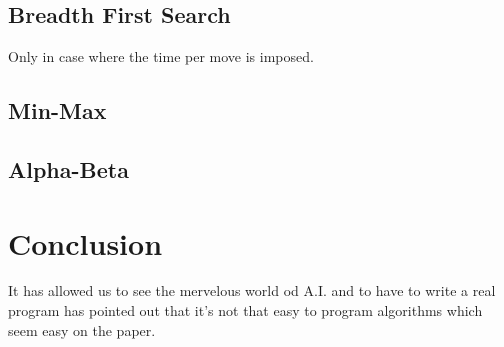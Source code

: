 \documentclass{book}
\begin{document}
\section{Breadth First Search}
Only in case where the time per move is imposed.
\section{Min-Max}
\section{Alpha-Beta}



\chapter{Conclusion}
It has allowed us to see the mervelous world od A.I. and to have to write a real program has pointed out that it's not that easy to program algorithms which seem easy on the paper.
\end{document}
